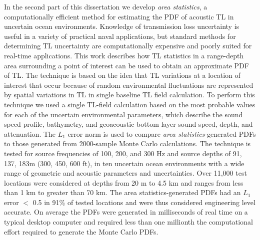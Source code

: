 In the second part of this dissertation we develop \textit{area
  statistics}, a computationally efficient method for estimating the
\ac{PDF} of acoustic \ac{TL} in uncertain ocean
environments. Knowledge of transmission loss uncertainty is useful in
a variety of practical naval applications, but standard methods for
determining \ac{TL} uncertainty are computationally expensive and
poorly suited for real-time applications. This work describes how
\ac{TL} statistics in a range-depth area surrounding a point of
interest can be used to obtain an approximate \ac{PDF} of \ac{TL}. The
technique is based on the idea that \ac{TL} variations at a location
of interest that occur because of random environmental fluctuations
are represented by spatial variations in \ac{TL} in single baseline
\ac{TL} field calculation. To perform this technique we used a single
\ac{TL}-field calculation based on the most probable values for each
of the uncertain environmental parameters, which describe the sound
speed profile, bathymetry, and geoacoustic bottom layer sound speed,
depth, and attenuation. The $L_1$ error norm is used to compare
\textit{area statistics}-generated \acp{PDF} to those generated from
2000-sample Monte Carlo calculations. The technique is tested for
source frequencies of 100, 200, and 300 Hz and source depths of 91,
137, 183m (300, 450, 600 ft), in ten uncertain ocean environments with
a wide range of geometric and acoustic parameters and uncertainties. Over 11,000 test
locations were considered at depths from 20 m to 4.5 km and
ranges from less than 1 km to greater than 70 km. The area
statistics-generated \acp{PDF} had an $L_1$ error $<$ 0.5 in 91\% of
tested locations and were thus considered engineering level
accurate. On average the \ac{PDF}s were generated in milliseconds of
real time on a typical desktop computer and required less than one
millionth the computational effort required to generate the Monte
Carlo \ac{PDF}s.  \setlength\parindent{0pt}%


